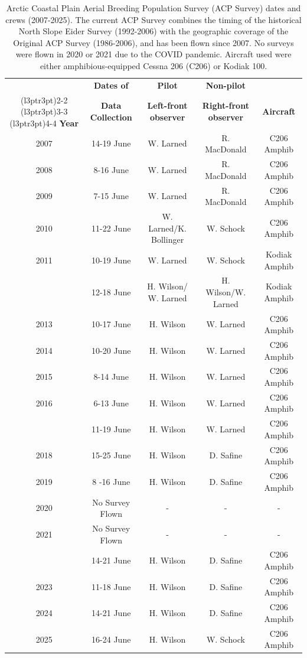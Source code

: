\documentclass[
]{article}
\begin{document}
\begingroup\fontsize{10}{12}\selectfont

\begin{longtable}[t]{ccccc}

\caption{\label{tbl-crew}Arctic Coastal Plain Aerial Breeding Population
Survey (ACP Survey) dates and crews (2007-2025). The current ACP Survey
combines the timing of the historical North Slope Eider Survey
(1992-2006) with the geographic coverage of the Original ACP Survey
(1986-2006), and has been flown since 2007. No surveys were flown in
2020 or 2021 due to the COVID pandemic. Aircraft used were either
amphibious-equipped Cessna 206 (C206) or Kodiak 100.}

\tabularnewline

\\
\toprule
\multicolumn{1}{c}{\textbf{ }} & \multicolumn{1}{c}{\textbf{Dates of}} & \multicolumn{1}{c}{\textbf{Pilot}} & \multicolumn{1}{c}{\textbf{Non-pilot}} & \multicolumn{1}{c}{\textbf{ }} \\
\cmidrule(l{3pt}r{3pt}){2-2} \cmidrule(l{3pt}r{3pt}){3-3} \cmidrule(l{3pt}r{3pt}){4-4}
\textbf{Year} & \textbf{Data Collection} & \textbf{Left-front observer} & \textbf{Right-front observer} & \textbf{Aircraft}\\
\midrule
2007 & 14-19 June & W. Larned & R. MacDonald & C206 Amphib\\
2008 & 8-16 June & W. Larned & R. MacDonald & C206 Amphib\\
2009 & 7-15 June & W. Larned & R. MacDonald & C206 Amphib\\
2010 & 11-22 June & W. Larned/K. Bollinger & W. Schock & C206 Amphib\\
2011 & 10-19 June & W. Larned & W. Schock & Kodiak Amphib\\
\addlinespace
2012 & 12-18 June & H. Wilson/ W. Larned & H. Wilson/W. Larned & Kodiak Amphib\\
2013 & 10-17 June & H. Wilson & W. Larned & C206 Amphib\\
2014 & 10-20 June & H. Wilson & W. Larned & C206 Amphib\\
2015 & 8-14 June & H. Wilson & W. Larned & C206 Amphib\\
2016 & 6-13 June & H. Wilson & W. Larned & C206 Amphib\\
\addlinespace
2017 & 11-19 June & H. Wilson & W. Larned & C206 Amphib\\
2018 & 15-25 June & H. Wilson & D. Safine & C206 Amphib\\
2019 & 8 -16 June & H. Wilson & D. Safine & C206 Amphib\\
2020 & No Survey Flown & - & - & -\\
2021 & No Survey Flown & - & - & -\\
\addlinespace
2022 & 14-21 June & H. Wilson & D. Safine & C206 Amphib\\
2023 & 11-18 June & H. Wilson & D. Safine & C206 Amphib\\
2024 & 14-21 June & H. Wilson & D. Safine & C206 Amphib\\
2025 & 16-24 June & H. Wilson & W. Schock & C206 Amphib\\
\bottomrule

\end{longtable}
\end{document}
